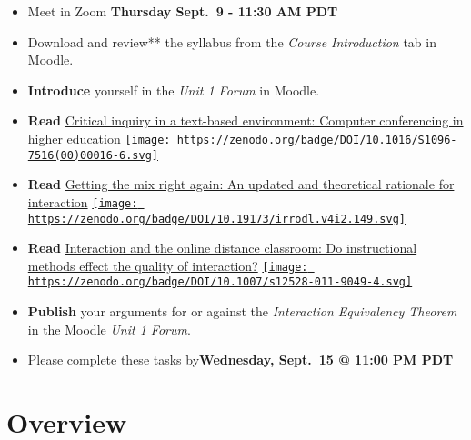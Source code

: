 \documentclass[
]{book}
\providecommand{\tightlist}{%
  \setlength{\itemsep}{0pt}\setlength{\parskip}{0pt}}
\begin{document}
\begin{itemize}
\tightlist
\item
  Meet in Zoom \textbf{Thursday Sept.~9 - 11:30 AM PDT}\\
\item
  Download and review** the syllabus from the \emph{Course Introduction} tab in Moodle.\\
\item
  \textbf{Introduce} yourself in the \emph{Unit 1 Forum} in Moodle.\\
\item
  \textbf{Read} \href{https://www-sciencedirect-com.ezproxy.student.twu.ca/science/article/pii/S1096751600000166}{Critical inquiry in a text-based environment: Computer conferencing in higher education} \href{https://www-sciencedirect-com.ezproxy.student.twu.ca/science/article/pii/S1096751600000166}{\texttt{[image: https://zenodo.org/badge/DOI/10.1016/S1096-7516(00)00016-6.svg]}}
\item
  \textbf{Read} \href{http://www.irrodl.org/index.php/irrodl/article/view/149/230}{Getting the mix right again: An updated and theoretical rationale for interaction} \href{https://doi.org/10.19173/irrodl.v4i2.149}{\texttt{[image: https://zenodo.org/badge/DOI/10.19173/irrodl.v4i2.149.svg]}}\\
\item
  \textbf{Read} \href{https://link-springer-com.ezproxy.student.twu.ca/article/10.1007/s12528-011-9049-4}{Interaction and the online distance classroom: Do instructional methods effect the quality of interaction?} \href{https://link-springer-com.ezproxy.student.twu.ca/article/10.1007/s12528-011-9049-4}{\texttt{[image: https://zenodo.org/badge/DOI/10.1007/s12528-011-9049-4.svg]}}\\
\item
  \textbf{Publish} your arguments for or against the \emph{Interaction Equivalency Theorem} in the Moodle \emph{Unit 1 Forum}.\\
\item
  Please complete these tasks by\textbf{Wednesday, Sept.~15 @ 11:00 PM PDT}
\end{itemize}

\hypertarget{overview}{%
\section*{Overview}\label{overview}}
\end{document}
